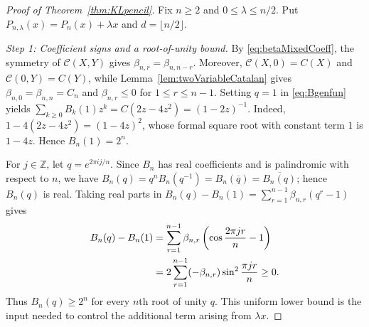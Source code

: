 \documentclass[10pt,a4paper]{amsart}
\begin{document}
\begin{proof}[Proof of Theorem~\ref{thm:KLpencil}]
Fix $n\ge2$ and $0\le\lambda\le n/2$.  Put
$P_{n,\lambda}(x)=P_n(x)+\lambda x$ and
$d=\lfloor n/2\rfloor$.

\medskip
\noindent\emph{Step 1: Coefficient signs and a root-of-unity bound.}
By \eqref{eq:betaMixedCoeff}, the symmetry of $\mathcal C(X,Y)$ gives
$\beta_{n,r}=\beta_{n,n-r}$.  Moreover,
$\mathcal C(X,0)=C(X)$ and $\mathcal C(0,Y)=C(Y)$, while
Lemma~\ref{lem:twoVariableCatalan} gives
$\beta_{n,0}=\beta_{n,n}=C_n$ and
$\beta_{n,r}\le0$ for $1\le r\le n-1$.
Setting $q=1$ in \eqref{eq:Bgenfun} yields
$\sum_{k\ge0}B_k(1)z^k=C(2z-4z^2)=(1-2z)^{-1}$.  Indeed,
$1-4(2z-4z^2)=(1-4z)^2$, whose formal square root with constant
term $1$ is $1-4z$.  Hence
$B_n(1)=2^n$.

For $j\in\mathbb Z$, let $q=e^{2\pi ij/n}$.  Since $B_n$ has real
coefficients and is palindromic with respect to $n$, we have
$B_n(q)=q^nB_n(q^{-1})=B_n(\overline q)=\overline{B_n(q)}$; hence
$B_n(q)$ is real.  Taking real parts in
$B_n(q)-B_n(1)=\sum_{r=1}^{n-1}\beta_{n,r}(q^r-1)$ gives
\begin{align}
B_n(q)-B_n(1)
&=\sum_{r=1}^{n-1}\beta_{n,r}
\left(\cos\frac{2\pi jr}{n}-1\right) \notag\\
&=2\sum_{r=1}^{n-1}(-\beta_{n,r})
\sin^2\frac{\pi jr}{n}\ge0.
\label{eq:BnRootUnityBound}
\end{align}
Thus $B_n(q)\ge2^n$ for every $n$th root of unity $q$.  This
uniform lower bound is the input needed to control the additional
term arising from $\lambda x$.


\end{proof}
\end{document}
